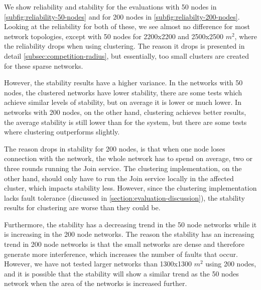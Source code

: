 \begin{newtext}
We show reliability and stability for the evaluations with 50 nodes in \cref{subfig:reliability-50-nodes} and for 200 nodes in \cref{subfig:reliabilty-200-nodes}. Looking at the reliability for both of these, we see almost no difference for most network topologies, except with 50 nodes for 2200x2200 and 2500x2500 $m^2$, where the reliability drops when using clustering. The reason it drops is presented in detail \cref{subsec:competition-radius}, but essentially, too small clusters are created for these sparse networks.

However, the stability results have a higher variance. In the networks with 50 nodes, the clustered networks have lower stability, there are some tests which achieve similar levels of stability, but on average it is lower or much lower. In networks with 200 nodes, on the other hand, clustering achieves better results, the average stability is still lower than for the \atwo{} system, but there are some tests where clustering outperforms \atwo{} slightly. 

The reason \atwo{} drops in stability for 200 nodes, is that when one node loses connection with the network, the whole network has to spend on average, two or three rounds running the Join service. The clustering implementation, on the other hand, should only have to run the Join service locally in the affected cluster, which impacts stability less. However, since the clustering implementation lacks fault tolerance (discussed in \cref{section:evaluation-discussion}), the stability results for clustering are worse than they could be.

Furthermore, the stability has a decreasing trend in the 50 node networks while it is increasing in the 200 node networks. The reason the stability has an increasing trend in 200 node networks is that the small networks are dense and therefore generate more interference, which increases the number of faults that occur. However, we have not tested larger networks than 1300x1300 $m^2$ using 200 nodes, and it is possible that the stability will show a similar trend as the 50 nodes network when the area of the networks is increased further.

\end{newtext}
